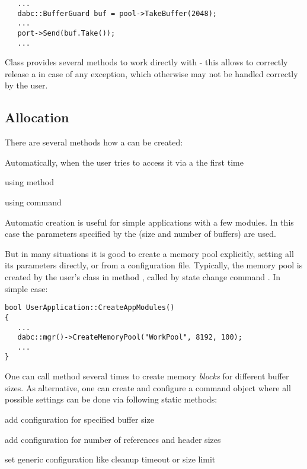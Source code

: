 \begin{small}
\begin{verbatim}     
   ...
   dabc::BufferGuard buf = pool->TakeBuffer(2048);
   ...
   port->Send(buf.Take());
   ...
\end{verbatim}     
\end{small}

Class  provides several methods to work directly 
with  - this allows to correctly release a 
in case of any exception, which otherwise may not be handled correctly by the user.  


\subsection{Allocation}
\label{prog_services_memory_allocation}
There are several methods how a  can be created:
\bbul
\item Automatically, when the user  tries to access it via a 
 the first time

\item using  method

\item using  command
\ebul

Automatic creation is useful for simple applications with a few modules.
In this case the parameters specified by the 
 (size and number of buffers) are used. 

But in many situations it is good to create a memory pool explicitly,
setting all its parameters directly, or from a  configuration file.
Typically, the memory pool is created by the user's  class in 
method , called by state change command .
In simple case:

\begin{small}
\begin{verbatim}     
bool UserApplication::CreateAppModules()
{
   ...
   dabc::mgr()->CreateMemoryPool("WorkPool", 8192, 100);
   ...
}
\end{verbatim}     
\end{small}

One can call  method several times to create 
memory {\em blocks} for different buffer sizes. As alternative, one can create and 
configure a command object  
where all possible settings can be 
done via following static methods:
\bbul
\item[\func{AddMem()}] add configuration for specified buffer size 
\item[\func{AddRef()}] add configuration for number of references and header sizes 
\item[\func{AddCfg()}] set generic configuration like cleanup timeout or size limit 
\ebul

